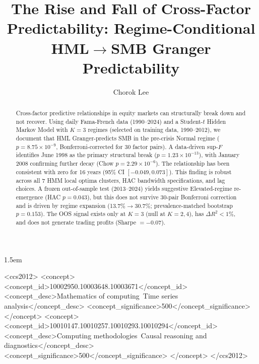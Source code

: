 \documentclass[sigconf,anonymous]{acmart}
\begin{document}
\sloppy
\emergencystretch 1.5em

\title{The Rise and Fall of Cross-Factor Predictability: Regime-Conditional HML$\to$SMB Granger Predictability}

\author{Chorok Lee}

\begin{abstract}
Cross-factor predictive relationships in equity markets can structurally
break down and not recover.
Using daily Fama-French data (1990--2024) and a Student-$t$ Hidden Markov Model
with $K{=}3$ regimes (selected on training data, 1990--2012),
we document that HML Granger-predicts SMB in the pre-crisis Normal regime
($p = 8.75 \times 10^{-9}$, Bonferroni-corrected for 30 factor pairs).
A data-driven sup-$F$ identifies June 1998 as the primary structural break
($p = 1.23\times10^{-13}$), with January 2008 confirming further decay
(Chow $p = 2.29\times10^{-6}$). The relationship has been
consistent with zero for 16 years (95\% CI $[-0.049, 0.073]$).
This finding is robust across all 7 HMM local optima clusters,
HAC bandwidth specifications, and lag choices.
A frozen out-of-sample test (2013--2024) yields suggestive Elevated-regime
re-emergence (HAC $p = 0.043$), but this does not survive 30-pair
Bonferroni correction and is driven by regime expansion
(13.7\%$\to$30.7\%; prevalence-matched bootstrap $p = 0.153$).
The OOS signal exists only at $K{=}3$ (null at $K{=}2,4$),
has $\Delta R^2 < 1\%$, and does not generate trading profits
(Sharpe $= -0.07$).
\end{abstract}

\begin{CCSXML}
<ccs2012>
   <concept>
       <concept_id>10002950.10003648.10003671</concept_id>
       <concept_desc>Mathematics of computing~Time series analysis</concept_desc>
       <concept_significance>500</concept_significance>
   </concept>
   <concept>
       <concept_id>10010147.10010257.10010293.10010294</concept_id>
       <concept_desc>Computing methodologies~Causal reasoning and diagnostics</concept_desc>
       <concept_significance>500</concept_significance>
   </concept>
</ccs2012>
\end{CCSXML}

\end{document}

